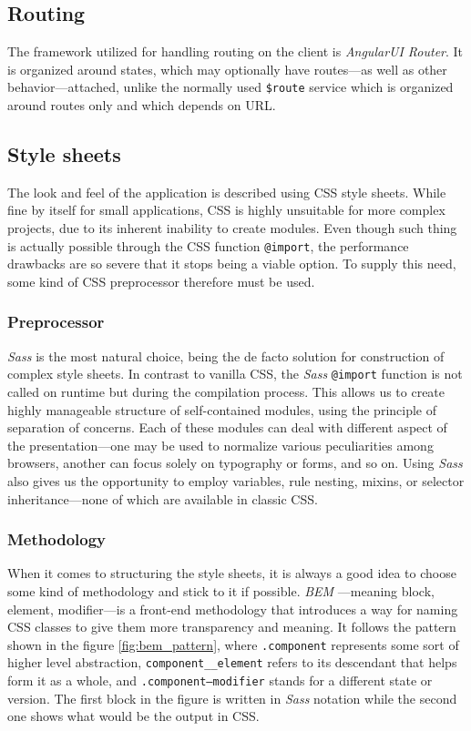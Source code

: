 \documentclass[thesis=M,english,hidelinks]{FITthesis}[2012/10/20]
\newcommand{\code}{\texttt}
\begin{document}
  \subsection{Routing}

The framework utilized for handling routing on the client is \textit{AngularUI Router}. It is organized around states, which may optionally have routes---as well as other behavior---attached, unlike the normally used \code{\$route} service which is organized around routes only and which depends on URL.

  \subsection{Style sheets}

The look and feel of the application is described using CSS style sheets. While fine by itself for small applications, CSS is highly unsuitable for more complex projects, due to its inherent inability to create modules. Even though such thing is actually possible through the CSS function \code{@import}, the performance drawbacks are so severe that it stops being a viable option. To supply this need, some kind of CSS preprocessor therefore must be used.

    \subsubsection{Preprocessor}

\textit{Sass} \cite{sass} is the most natural choice, being the de facto solution for construction of complex style sheets. In contrast to vanilla CSS, the \textit{Sass} \code{@import} function is not called on runtime but during the compilation process. This allows us to create highly manageable structure of self-contained modules, using the principle of separation of concerns. Each of these modules can deal with different aspect of the presentation---one may be used to normalize various peculiarities among browsers, another can focus solely on typography or forms, and so on. Using \textit{Sass} also gives us the opportunity to employ variables, rule nesting, mixins, or selector inheritance---none of which are available in classic CSS.

    \subsubsection{Methodology}

When it comes to structuring the style sheets, it is always a good idea to choose some kind of methodology and stick to it if possible. \textit{BEM} \cite{bem}---meaning block, element, modifier---is a front-end methodology that introduces a way for naming CSS classes to give them more transparency and meaning. It follows the pattern shown in the figure \ref{fig:bem_pattern}, where \code{.component} represents some sort of higher level abstraction, \code{component\_\_element} refers to its descendant that helps form it as a whole, and \code{.component--modifier} stands for a different state or version. The first block in the figure is written in \textit{Sass} notation while the second one shows what would be the output in CSS.
\end{document}
